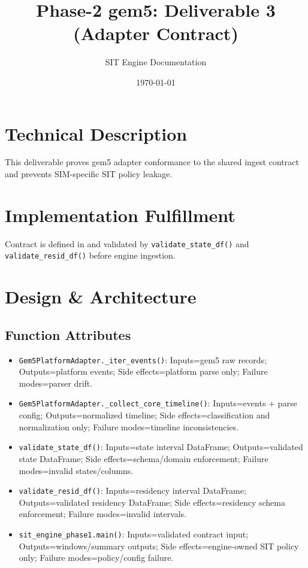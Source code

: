 \documentclass[11pt,a4paper]{article}
\title{Phase-2 gem5: Deliverable 3 (Adapter Contract)}
\author{SIT Engine Documentation}
\date{\today}
\newcommand{\codepath}[1]{\path{#1}}
\begin{document}
\maketitle

\section{Technical Description}
This deliverable proves gem5 adapter conformance to the shared ingest contract and prevents SIM-specific SIT policy leakage.

\section{Implementation Fulfillment}
Contract is defined in \codepath{Phase-2/ADAPTERS.md} and validated by \texttt{validate\_state\_df()} and \texttt{validate\_resid\_df()} before engine ingestion.

\section{Design \& Architecture}
\subsection*{Function Attributes}
\begin{itemize}[leftmargin=*]
  \item \texttt{Gem5PlatformAdapter.\_iter\_events()}: Inputs=gem5 raw records; Outputs=platform events; Side effects=platform parse only; Failure modes=parser drift.
  \item \texttt{Gem5PlatformAdapter.\_collect\_core\_timeline()}: Inputs=events + parse config; Outputs=normalized timeline; Side effects=classification and normalization only; Failure modes=timeline inconsistencies.
  \item \texttt{validate\_state\_df()}: Inputs=state interval DataFrame; Outputs=validated state DataFrame; Side effects=schema/domain enforcement; Failure modes=invalid states/columns.
  \item \texttt{validate\_resid\_df()}: Inputs=residency interval DataFrame; Outputs=validated residency DataFrame; Side effects=residency schema enforcement; Failure modes=invalid intervals.
  \item \texttt{sit\_engine\_phase1.main()}: Inputs=validated contract input; Outputs=windows/summary outputs; Side effects=engine-owned SIT policy only; Failure modes=policy/config failure.
\end{itemize}
\end{document}
